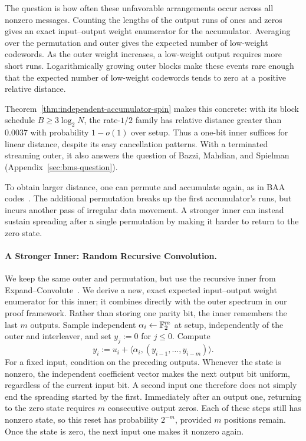 The question is how often these unfavorable arrangements occur across
all nonzero messages. Counting the lengths of the output runs of ones and
zeros gives an exact input--output weight enumerator for the accumulator. Averaging
over the permutation and outer gives the expected number of low-weight
codewords. As the outer weight increases, a low-weight output requires
more short runs. Logarithmically growing outer blocks make these events
rare enough that the expected number of low-weight codewords tends to zero
at a positive relative distance.

Theorem~\ref{thm:independent-accumulator-spin} makes this concrete:
with its block schedule $B\ge3\log_2N$, the rate-$1/2$ family has relative
distance greater than $0.0037$ with probability $1-o(1)$ over setup.
Thus a one-bit inner suffices for linear distance, despite its easy
cancellation patterns.
With a terminated streaming outer, it also answers the question of
Bazzi, Mahdian, and Spielman~\cite{bms09} (Appendix~\ref{sec:bms-question}).

To obtain larger distance, one can permute and accumulate again, as in
BAA codes~\cite{KolesnikovEtAl2026BA}. The additional permutation breaks up
the first accumulator's runs, but incurs another pass of irregular data
movement. A stronger inner can instead sustain spreading after a single
permutation by making it harder to return to the zero state.

\paragraph{A Stronger Inner: Random Recursive Convolution.}
We keep the same outer and permutation, but use the recursive inner from
Expand--Convolute~\cite{RaghuramanRindalTanguy2023EC}. We derive a new,
exact expected input--output weight enumerator for this inner; it combines
directly with the outer spectrum in our proof framework.
Rather than storing one parity bit, the inner remembers the last $m$ outputs. Sample
independent $\alpha_i\gets\mathbb F_2^m$ at setup, independently of the outer and
interleaver, and set $y_j:=0$ for $j\le0$. Compute
\[
 y_i:=u_i+\langle\alpha_i,(y_{i-1},\ldots,y_{i-m})\rangle.
\]
For a fixed input, condition on the preceding outputs. Whenever the state
is nonzero, the independent coefficient vector makes the next output bit
uniform, regardless of the current input bit. A second input one therefore
does not simply end the spreading started by the first. Immediately after
an output one, returning to the zero state requires $m$ consecutive output
zeros. Each of these steps still has nonzero state, so this reset has
probability $2^{-m}$, provided $m$ positions remain. Once the state is zero,
the next input one makes it nonzero again.

